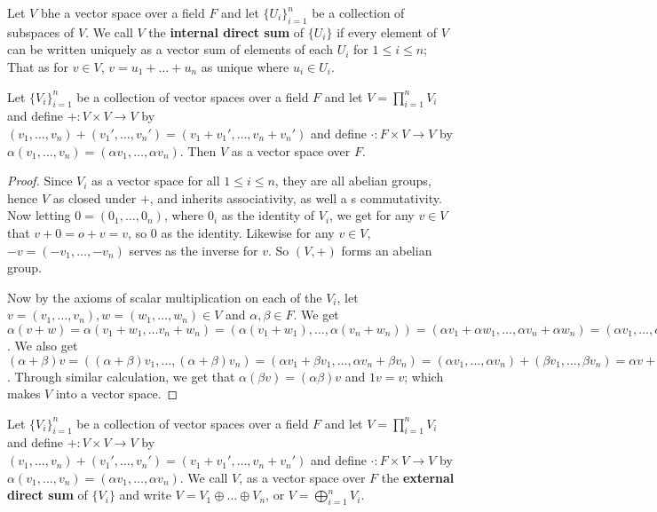 \begin{definition}
    Let $V$ bhe a vector space over a field  $F$ and let  $\{U_i\}_{i=1}^n$ be a
    collection of subspaces of $V$. We call $V$ the \textbf{internal direct
    sum} of $\{U_i\}$ if every element of $V$ can be written uniquely as a 
    vector sum of elements of each $U_i$ for $1 \leq i \leq n$; That as  for 
    $v \in V$, $v=u_1+\dots+u_n$ as unique where $u_i \in U_i$.
\end{definition}

\begin{lemma}\label{1.1.6}
    Let $\{V_i\}_{i=1}^n$ be a collection of vector spaces over a field $F$ and
    let  $V=\prod_{i=1}^n{V_i}$ and define $+:V \times V \rightarrow V$ by
    $(v_1, \dots, v_n)+(v_1', \dots, v_n')=(v_1+v_1', \dots, v_n+v_n')$ and
    define $\cdot:F \times V \rightarrow V$ by $\alpha(v_1, \dots, v_n)=(\alpha
    v_1, \dots, \alpha v_n)$. Then $V$ as a vector space over  $F$.
\end{lemma}
\begin{proof}
    Since $V_i$ as a vector space for all  $1 \leq i \leq n$, they are all
    abelian groups, hence  $V$ as closed under  $+$, and inherits associativity,
    as well a s commutativity. Now letting  $0=(0_1, \dots, 0_n)$, where $0_i$ 
    as the identity of  $V_i$, we get for any  $v \in V$ that  $v+0=o+v=v$, so  
    $0$ as the identity. Likewise for any  $v \in V$,  $-v=(-v_1, \dots, -v_n)$
    serves as the inverse for $v$. So  $(V,+)$ forms an abelian group.

    Now by the axioms of scalar multiplication on each of the $V_i$, let
    $v=(v_1, \dots, v_n),w=(w_1, \dots, w_n) \in V$ and $\alpha,\beta \in F$. We
    get  $\alpha(v+w)=\alpha(v_1+w_1, \dots v_n+w_n)=(\alpha(v_1+w_1), \dots,
    \alpha(v_n+w_n))=(\alpha v_1+\alpha w_1, \dots, \alpha v_n+\alpha
    w_n)=(\alpha v_1, \dots, \alpha v_n)+(\alpha w_1, \dots, \alpha w_n)=\alpha
    v+\alpha w$. We also get $(\alpha+\beta)v=((\alpha+\beta)v_1, \dots,
    (\alpha+\beta)v_n)=(\alpha v_1+\beta v_1, \dots, \alpha v_n+\beta
    v_n)=(\alpha v_1, \dots, \alpha v_n)+(\beta v_1, \dots, \beta v_n)=\alpha
    v+\beta v$. Through similar calculation, we get that $\alpha(\beta
    v)=(\alpha\beta)v$ and $1v=v$; which makes  $V$ into a vector space.
\end{proof}

\begin{definition}
    Let $\{V_i\}_{i=1}^n$ be a collection of vector spaces over a field $F$ and
    let  $V=\prod_{i=1}^n{V_i}$ and define $+:V \times V \rightarrow V$ by
    $(v_1, \dots, v_n)+(v_1', \dots, v_n')=(v_1+v_1', \dots, v_n+v_n')$ and
    define $\cdot:F \times V \rightarrow V$ by $\alpha(v_1, \dots, v_n)=(\alpha
    v_1, \dots, \alpha v_n)$. We call $V$, as a vector space over  $F$ the
    \textbf{external direct sum} of $\{V_i\}$ and write $V=V_1 \oplus \dots
    \oplus V_n$, or $V=\bigoplus_{i=1}^n{V_i}$.
\end{definition}

